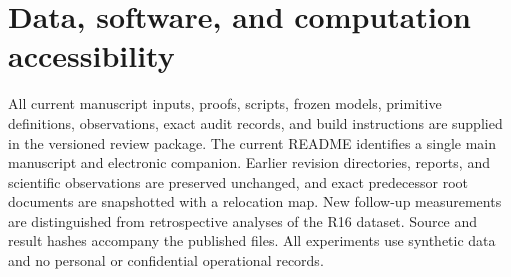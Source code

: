 \documentclass[11pt,letterpaper]{article}
\theoremstyle{definition}
\newcommand{\1}{\mathbf 1}
\begin{document}
\section*{Data, software, and computation accessibility}
All current manuscript inputs, proofs, scripts, frozen models, primitive definitions, observations, exact audit records, and build instructions are supplied in the versioned review package. The current README identifies a single main manuscript and electronic companion. Earlier revision directories, reports, and scientific observations are preserved unchanged, and exact predecessor root documents are snapshotted with a relocation map. New follow-up measurements are distinguished from retrospective analyses of the R16 dataset. Source and result hashes accompany the published files. All experiments use synthetic data and no personal or confidential operational records.
\clearpage\label{r19-reference-start}

\label{r19-reference-end}
\end{document}
